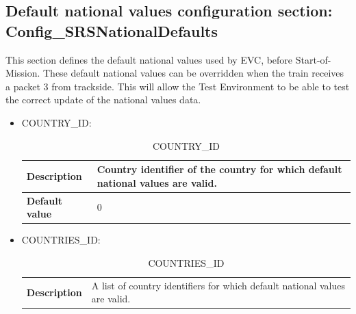\subsection{Default national values configuration section: Config\_SRSNationalDefaults}
	This section defines the default national values used by EVC, before Start-of-Mission. These default national values can be overridden when the train receives a packet 3 from trackside. This will allow the Test Environment to be able to test the correct update of the national values data.

	\begin{itemize}
		\item COUNTRY\_ID:

			\begin{longtable}{|l|l|}
				\caption{COUNTRY\_ID}\\
				\hline

					\begin{minipage}[t]{0.22\linewidth} \textbf{Description}	\end{minipage}
				&	\begin{minipage}[t]{0.78\linewidth} Country identifier of the country for which default national values are valid. \end{minipage} \\

				\hline

					\begin{minipage}[t]{0.22\linewidth} \textbf{Default value}	\end{minipage}
				&	\begin{minipage}[t]{0.78\linewidth} 0 \end{minipage} \\

				\hline

			\end{longtable}

		\item COUNTRIES\_ID:

			\begin{longtable}{|l|l|}
				\caption{COUNTRIES\_ID}\\
				\hline

					\begin{minipage}[t]{0.22\linewidth} \textbf{Description}	\end{minipage}
				&	\begin{minipage}[t]{0.78\linewidth} A list of country identifiers for which default national values are valid. \end{minipage} \\


\end{longtable}
\end{itemize}
